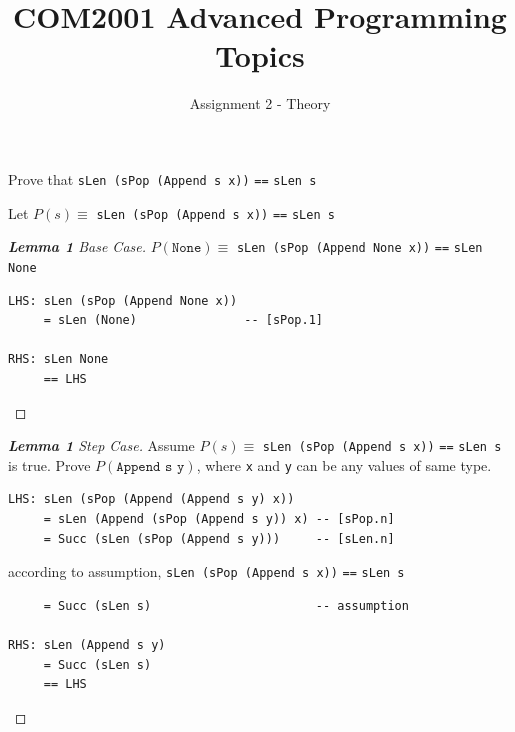 \documentclass[12pt]{article}
\newcommand{\haskell}{\texttt}
\newenvironment{lemma}[2][Lemma]{\begin{trivlist}
\item[\hskip \labelsep {\bfseries #1}\hskip \labelsep {\bfseries #2.}]}{\end{trivlist}}
\newenvironment{question}[2][Question]{\begin{trivlist}
\item[\hskip \labelsep {\bfseries #1}\hskip \labelsep {\bfseries #2.}]}{\end{trivlist}}
\begin{document}
 
\title{COM2001 Advanced Programming Topics}
\author{Assignment 2 - Theory} 
\date{}

\maketitle

\begin{question}{1}
\end{question}

\begin{lemma}{1}
Prove that \haskell{sLen (sPop (Append s x))} \haskell{==} 
\haskell{sLen s}
\end{lemma}

\begin{center}
Let $P(s) \equiv$ \haskell{sLen (sPop (Append s x))} \haskell{==} \haskell{sLen s}
\end{center}

\begin{proof}[\textbf{Lemma 1} Base Case]
$P(\haskell{None}) \equiv $ \haskell{sLen (sPop (Append None x))} \haskell{==} \haskell{sLen None}

\begin{mdframed}
\begin{verbatim}
LHS: sLen (sPop (Append None x))
     = sLen (None)               -- [sPop.1]

RHS: sLen None
     == LHS
\end{verbatim}
\end{mdframed}
\end{proof}

\begin{proof}[\textbf{Lemma 1} Step Case]
Assume $P(s) \equiv$ \haskell{sLen (sPop (Append s x))} \haskell{==} 
\haskell{sLen s} is true. Prove $P(\haskell{Append s y})$, where 
\haskell{x} and \haskell{y} can be any values of same type.
\begin{mdframed}
\begin{verbatim}
LHS: sLen (sPop (Append (Append s y) x))
     = sLen (Append (sPop (Append s y)) x) -- [sPop.n]
     = Succ (sLen (sPop (Append s y)))     -- [sLen.n]
\end{verbatim}     

according to assumption, \haskell{sLen (sPop (Append s x))} 
\haskell{==} \haskell{sLen s}
\begin{verbatim}
     = Succ (sLen s)                       -- assumption
   
RHS: sLen (Append s y)
     = Succ (sLen s)
     == LHS
\end{verbatim}
\end{mdframed}
\end{proof}
\end{document}
